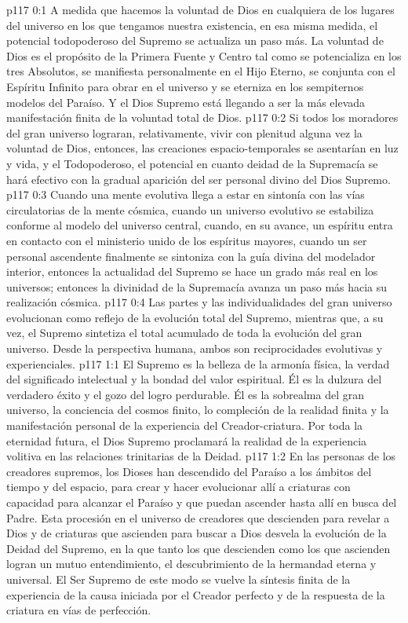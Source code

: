 \author{Mensajero poderoso}
\vs p117 0:1 A medida que hacemos la voluntad de Dios en cualquiera de los lugares del universo en los que tengamos nuestra existencia, en esa misma medida, el potencial todopoderoso del Supremo se actualiza un paso más. La voluntad de Dios es el propósito de la Primera Fuente y Centro tal como se potencializa en los tres Absolutos, se manifiesta personalmente en el Hijo Eterno, se conjunta con el Espíritu Infinito para obrar en el universo y se eterniza en los sempiternos modelos del Paraíso. Y el Dios Supremo está llegando a ser la más elevada manifestación finita de la voluntad total de Dios.
\vs p117 0:2 Si todos los moradores del gran universo lograran, relativamente, vivir con plenitud alguna vez la voluntad de Dios, entonces, las creaciones espacio\hyp{}temporales se asentarían en luz y vida, y el Todopoderoso, el potencial en cuanto deidad de la Supremacía se hará efectivo con la gradual aparición del ser personal divino del Dios Supremo.
\vs p117 0:3 Cuando una mente evolutiva llega a estar en sintonía con las vías circulatorias de la mente cósmica, cuando un universo evolutivo se estabiliza conforme al modelo del universo central, cuando, en su avance, un espíritu entra en contacto con el ministerio unido de los espíritus mayores, cuando un ser personal ascendente finalmente se sintoniza con la guía divina del modelador interior, entonces la actualidad del Supremo se hace un grado más real en los universos; entonces la divinidad de la Supremacía avanza un paso más hacia su realización cósmica.
\vs p117 0:4 Las partes y las individualidades del gran universo evolucionan como reflejo de la evolución total del Supremo, mientras que, a su vez, el Supremo sintetiza el total acumulado de toda la evolución del gran universo. Desde la perspectiva humana, ambos son reciprocidades evolutivas y experienciales.
\vs p117 1:1 El Supremo es la belleza de la armonía física, la verdad del significado intelectual y la bondad del valor espiritual. Él es la dulzura del verdadero éxito y el gozo del logro perdurable. Él es la sobrealma del gran universo, la conciencia del cosmos finito, lo compleción de la realidad finita y la manifestación personal de la experiencia del Creador\hyp{}criatura. Por toda la eternidad futura, el Dios Supremo proclamará la realidad de la experiencia volitiva en las relaciones trinitarias de la Deidad.
\vs p117 1:2 \pc En las personas de los creadores supremos, los Dioses han descendido del Paraíso a los ámbitos del tiempo y del espacio, para crear y hacer evolucionar allí a criaturas con capacidad para alcanzar el Paraíso y que puedan ascender hasta allí en busca del Padre. Esta procesión en el universo de creadores que descienden para revelar a Dios y de criaturas que ascienden para buscar a Dios desvela la evolución de la Deidad del Supremo, en la que tanto los que descienden como los que ascienden logran un mutuo entendimiento, el descubrimiento de la hermandad eterna y universal. El Ser Supremo de este modo se vuelve la síntesis finita de la experiencia de la causa iniciada por el Creador perfecto y de la respuesta de la criatura en vías de perfección.

